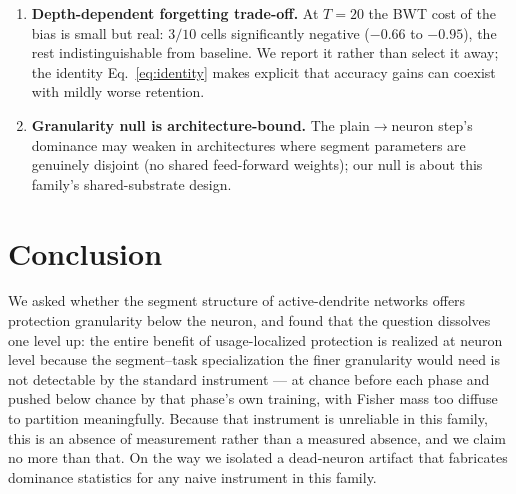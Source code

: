 \documentclass[10pt]{article}
\begin{document}
\begin{enumerate}
      We also tested scheduled variants
      (Suppl.~S4): an annealed bias ($b_p = 10(1-p/T)$) retains
      $91$--$103\%$ of the constant-bias learning gain at $T{=}20$ but
      does not reliably remove the BWT cost (significant improvement in
      one of two datasets only), while a ramped bias ($b_p = 10p/(T{-}1)$)
      \emph{exceeds} the constant gain everywhere ($123$--$197\%$
      retention, $t \ge 2.6$) at an equally or more negative BWT cost.
      Scheduling moves along the retention--plasticity frontier ---
      tracking cumulative bias exposure, not timing --- but does not
      move the frontier itself; separating gain from cost appears to
      require a mechanism (e.g.\ task-staggered protection), not a
      schedule.
\item \textbf{Depth-dependent forgetting trade-off.} At $T{=}20$ the BWT
      cost of the bias is small but real: $3/10$ cells significantly
      negative ($-0.66$ to $-0.95$), the rest indistinguishable from
      baseline. We
      report it rather than select it away; the identity
      Eq.~\eqref{eq:identity} makes explicit that accuracy gains can
      coexist with mildly worse retention.
\item \textbf{Granularity null is architecture-bound.} The
      plain$\to$neuron step's dominance may weaken in architectures where
      segment parameters are genuinely disjoint (no shared feed-forward
      weights); our null is about this family's shared-substrate design.
\end{enumerate}



\section{Conclusion}
\label{sec:conclusion}

We asked whether the segment structure of active-dendrite networks offers
protection granularity below the neuron, and found that the question
dissolves one level up: the entire benefit of usage-localized protection is
realized at neuron level because the segment--task specialization the finer
granularity would need is not detectable by the standard instrument --- at
chance before each phase and pushed below chance by that phase's own training,
with Fisher mass too diffuse to partition meaningfully. Because that
instrument is unreliable in this family, this is an absence of measurement
rather than a measured absence, and we claim no more than that. On the way we isolated a dead-neuron artifact that
fabricates dominance statistics for any naive instrument in this family.
\end{document}
